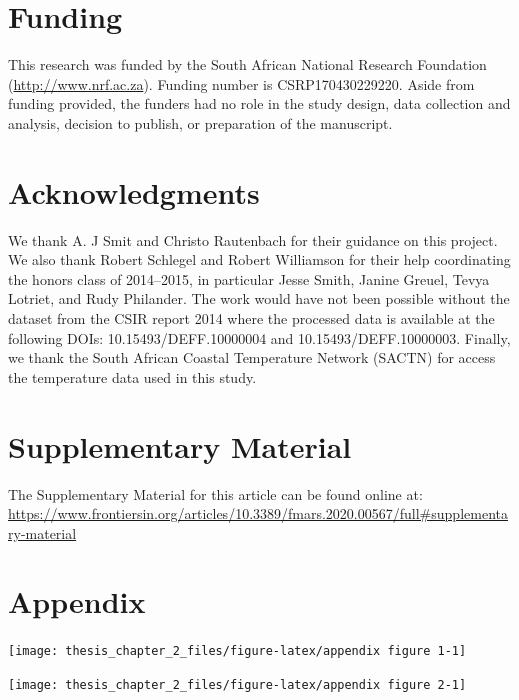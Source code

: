 \documentclass[
  a4paper,
]{article}
\begin{document}
\hypertarget{funding}{%
\section{Funding}\label{funding}}

This research was funded by the South African National Research
Foundation (\url{http://www.nrf.ac.za}). Funding number is
CSRP170430229220. Aside from funding provided, the funders had no role
in the study design, data collection and analysis, decision to publish,
or preparation of the manuscript.

\hypertarget{acknowledgments}{%
\section{Acknowledgments}\label{acknowledgments}}

We thank A. J Smit and Christo Rautenbach for their guidance on this
project. We also thank Robert Schlegel and Robert Williamson for their
help coordinating the honors class of 2014--2015, in particular Jesse
Smith, Janine Greuel, Tevya Lotriet, and Rudy Philander. The work would
have not been possible without the dataset from the CSIR report 2014
where the processed data is available at the following DOIs:
10.15493/DEFF.10000004 and 10.15493/DEFF.10000003. Finally, we thank the
South African Coastal Temperature Network (SACTN) for access the
temperature data used in this study.

\hypertarget{supplementary-material}{%
\section{Supplementary Material}\label{supplementary-material}}

The Supplementary Material for this article can be found online at:
\url{https://www.frontiersin.org/articles/10.3389/fmars.2020.00567/full\#supplementary-material}

\hypertarget{appendix}{%
\section{Appendix}\label{appendix}}

\begin{center}\texttt{[image: thesis\_chapter\_2\_files/figure-latex/appendix figure 1-1]} \end{center}

\begin{center}\texttt{[image: thesis\_chapter\_2\_files/figure-latex/appendix figure 2-1]} \end{center}
\end{document}
